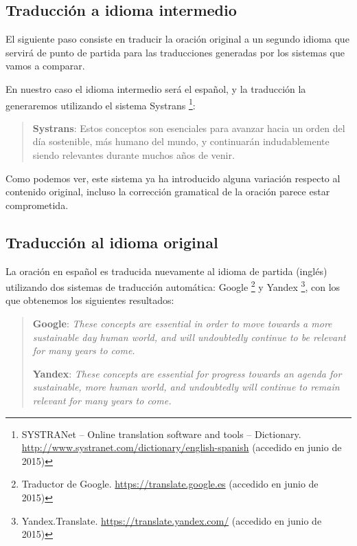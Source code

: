 \documentclass[a4paper,12pt,spanish]{book}
\begin{document}
\subsection{Traducción a idioma intermedio}
\label{5.pruebas/index:traduccion-a-idioma-intermedio}
El siguiente paso consiste en traducir la oración original a un segundo idioma que
servirá de punto de partida para las traducciones generadas por los sistemas que vamos
a comparar.

En nuestro caso el idioma intermedio será el español, y la traducción la generaremos
utilizando el sistema Systrans \footnote{
SYSTRANet – Online translation software and tools – Dictionary.
\href{http://www.systranet.com/dictionary/english-spanish}{http://www.systranet.com/dictionary/english-spanish} (accedido en junio
de 2015)
}:
\begin{quote}

\textbf{Systrans}: Estos conceptos son esenciales para avanzar hacia un orden del día sostenible, más humano del mundo, y continuarán indudablemente siendo relevantes durante muchos años de venir.
\end{quote}

Como podemos ver, este sistema ya ha introducido alguna variación respecto al contenido
original, incluso la corrección gramatical de la oración parece estar comprometida.


\subsection{Traducción al idioma original}
\label{5.pruebas/index:traduccion-al-idioma-original}
La oración en español es traducida nuevamente al idioma de partida (inglés) utilizando
dos sistemas de traducción automática: Google \footnote{
Traductor de Google. \href{https://translate.google.es}{https://translate.google.es} (accedido en junio de 2015)
} y Yandex \footnote{
Yandex.Translate. \href{https://translate.yandex.com/}{https://translate.yandex.com/} (accedido en junio de 2015)
}, con los que obtenemos
los siguientes resultados:
\begin{quote}

\textbf{Google}: \emph{These concepts are essential in order to move towards a more sustainable day human world, and will undoubtedly continue to be relevant for many years to come.}

\textbf{Yandex}: \emph{These concepts are essential for progress towards an agenda for sustainable, more human world, and undoubtedly will continue to remain relevant for many years to come.}
\end{quote}
\end{document}

